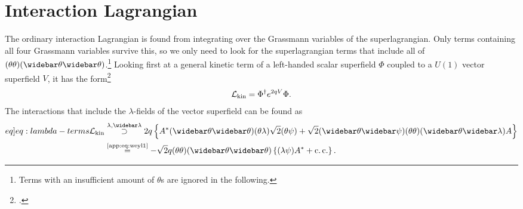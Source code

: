 \documentclass[english, notitlepage]{article}
\begin{document}
\section{Interaction Lagrangian}
    The ordinary interaction Lagrangian is found from integrating over the
    Grassmann variables of the superlagrangian. Only terms containing all four
    Grassmann variables survive this, so we only need to look for the
    superlagrangian terms that include all of
    $(\theta\theta)(\wbar\theta\wbar\theta)$.\footnote{Terms with an insufficient
        amount of $\theta$s are ignored in the following.} Looking first at a general
    kinetic term of a left-handed scalar superfield \(\Phi\) coupled to a $U(1)$ vector superfield \(V\), it has the form\footcite{Binetruy:2006ad}
    \begin{align}
        {\mathcal{L}}_\text{kin} = \Phi^\dag e^{2qV} \Phi.
    \end{align}
    The interactions that include the $\lambda$-fields of the vector superfield can be found as
    \begin{align}
        \label[eq]{eq:lambda-terms}
        \nonumber
        \msub{\L}{kin} & \stackrel{\lambda, \wbar\lambda}{\supset} 2q\cclosed{ A^* (\wbar\theta\wbar\theta)(\theta\lambda) \sqrt{2} (\theta\psi) + \sqrt{2} (\wbar\theta\wbar\psi) (\theta\theta)(\wbar\theta\wbar\lambda) A } \\
                       & \stackrel{\text{\cref{app:eq:weyl1}}}{=} -\sqrt{2}q (\theta\theta)(\wbar\theta\wbar\theta) \cclosed{ (\lambda\psi)A^* + \cc }.
    \end{align}
\end{document}
